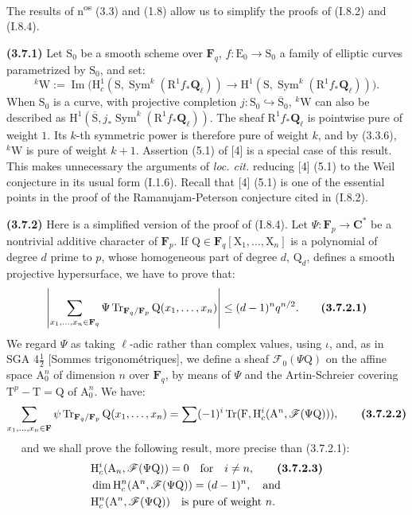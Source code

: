 \documentclass[11pt,leqno]{article}
\newcommand{\Page}[1]{\ifvmode\noindent\else\unskip\ \fi{\footnotesize\textcolor{gray}{[p.\,#1]}}\ \ignorespaces}
\begin{document}
The results of n\textsuperscript{os} (3.3) and (1.8) allow us to simplify the proofs of (I.8.2) and (I.8.4).

\textbf{(3.7.1)} Let \(\mathrm S_0\) be a smooth scheme over \(\mathbf F_q\), \(f:\mathrm E_0\to\mathrm S_0\) a family of elliptic curves parametrized by \(\mathrm S_0\), and set:
\[
{}^k\mathrm W:=\operatorname{Im}\bigl(
\mathrm H_c^1(\mathrm S,\operatorname{Sym}^k(\mathrm R^1f_*\mathbf Q_\ell))
\to\mathrm H^1(\mathrm S,\operatorname{Sym}^k(\mathrm R^1f_*\mathbf Q_\ell))
\bigr).
\]
When \(\mathrm S_0\) is a curve, with projective completion \(j:\mathrm S_0\hookrightarrow\overline{\mathrm S}_0\), \({}^k\mathrm W\) can also be described as \(\mathrm H^1(\overline{\mathrm S},j_*\operatorname{Sym}^k(\mathrm R^1f_*\mathbf Q_\ell))\). The sheaf \(\mathrm R^1f_*\mathbf Q_\ell\) is pointwise pure of weight \(1\). Its \(k\)-th symmetric power is therefore pure of weight \(k\), and by (3.3.6), \({}^k\mathrm W\) is pure of weight \(k+1\). Assertion (5.1) of [4] is a special case of this result. This makes unnecessary the arguments of \textit{loc. cit.} reducing [4] (5.1) to the Weil conjecture in its usual form (I.1.6). Recall that [4] (5.1) is one of the essential points in the proof of the Ramanujam-Peterson conjecture cited in (I.8.2).

\textbf{(3.7.2)} Here is a simplified version of the proof of (I.8.4). Let \(\Psi:\mathbf F_p\to\mathbf C^*\) be a nontrivial additive character of \(\mathbf F_p\). If \(\mathrm Q\in\mathbf F_q[\mathrm X_1,\ldots,\mathrm X_n]\) is a polynomial of degree \(d\) prime to \(p\), whose homogeneous part of degree \(d\), \(\mathrm Q_d\), defines a smooth projective hypersurface, we have to prove that:
\[
\left|
\sum_{x_1,\ldots,x_n\in\mathbf F_q}
\Psi\operatorname{Tr}_{\mathbf F_q/\mathbf F_p}\mathrm Q(x_1,\ldots,x_n)
\right|
\leq(d-1)^nq^{n/2}.
\tag*{\textbf{(3.7.2.1)}}
\]
We regard \(\Psi\) as taking \(\ell\)-adic rather than complex values, using \(\iota\), and, as in SGA \(4\frac{1}{2}\) [Sommes trigonométriques], we define a sheaf \(\mathscr F_0(\Psi\mathrm Q)\) on the affine space \(\mathrm A_0^n\) of dimension \(n\) over \(\mathbf F_q\), by means of \(\Psi\) and the Artin-Schreier covering \(\mathrm T^p-\mathrm T=\mathrm Q\) of \(\mathrm A_0^n\). We have:
\[
\sum_{x_1,\ldots,x_n\in\mathbf F}
\psi\operatorname{Tr}_{\mathbf F_q/\mathbf F_p}\mathrm Q(x_1,\ldots,x_n)
=
\sum(-1)^i\operatorname{Tr}(\mathrm F,\mathrm H_c^i(\mathrm A^n,\mathscr F(\Psi\mathrm Q))),
\tag*{\textbf{(3.7.2.2)}}
\]
\Page{216}
and we shall prove the following result, more precise than (3.7.2.1):
\begin{align*}
&\mathrm H_c^i(\mathrm A_n,\mathscr F(\Psi\mathrm Q))=0
\quad\text{for}\quad i\ne n,
\tag*{\textbf{(3.7.2.3)}}\\
&\dim\mathrm H_c^n(\mathrm A^n,\mathscr F(\Psi\mathrm Q))=(d-1)^n,
\quad\text{and}\\
&\mathrm H_c^n(\mathrm A^n,\mathscr F(\Psi\mathrm Q))
\quad\text{is pure of weight }n.
\end{align*}
\end{document}
